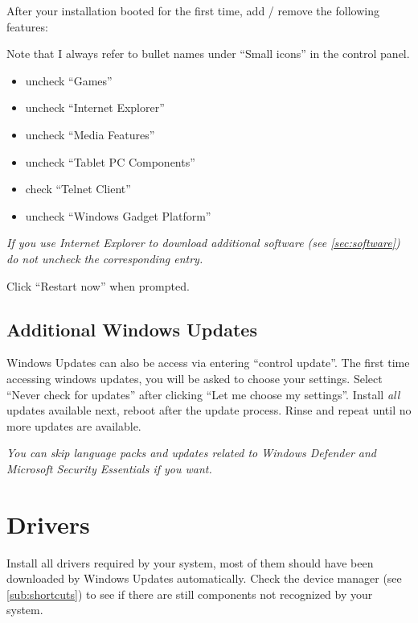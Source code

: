 \documentclass{itsarticle}
\begin{document}
After your installation booted for the first time, add / remove the following
features:


Note that I always refer to bullet names under ``Small icons'' in the control
panel.

\begin{itemize}
    \item uncheck ``Games''
    \item uncheck ``Internet Explorer''
    \item uncheck ``Media Features''
    \item uncheck ``Tablet PC Components''
    \item check ``Telnet Client''
    \item uncheck ``Windows Gadget Platform''
\end{itemize}

\textit{If you use Internet Explorer to download additional software (see
\cref{sec:software}) do not uncheck the corresponding entry.}

Click ``Restart now'' when prompted.

\subsection{Additional Windows Updates}
\label{sub:updates_post_install}

Windows Updates can also be access via  entering ``control
update''. The first time accessing windows updates, you will be asked to choose
your settings. Select ``Never check for updates'' after clicking ``Let me
choose my settings''. Install \emph{all} updates available next, reboot after
the update process. Rinse and repeat until no more updates are available.

\textit{You can skip language packs and updates related to Windows Defender and
Microsoft Security Essentials if you want.}

\section{Drivers}
\label{sec:drivers}

Install all drivers required by your system, most of them should have been
downloaded by Windows Updates automatically. Check the device manager (see
\cref{sub:shortcuts}) to see if there are still components not recognized by
your system.
\end{document}
